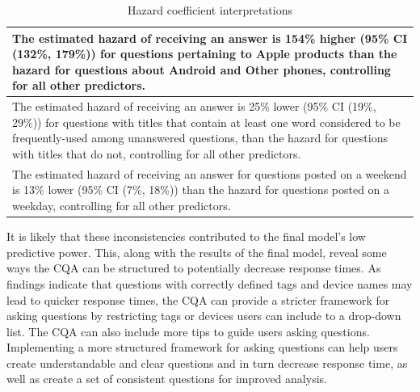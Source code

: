 \documentclass[final]{beamer}
\newlength{\onecolwid}
\begin{document}
\begin{frame}[t]
\begin{columns}[t]
\begin{column}{\onecolwid}
\begin{block}

\renewcommand{\arraystretch}{1.15} %
\begin{table}[!htbp]
\begin{tabular}{|p{26cm}|} 
  \hline
  The estimated hazard of receiving an answer is 154\% higher (95\% CI (132\%, 179\%)) for questions pertaining to Apple products than the hazard for questions about Android and Other phones, controlling for all other predictors. \\ \hline
  The estimated hazard of receiving an answer is 25\% lower (95\% CI (19\%, 29\%)) for questions with titles that contain at least one word considered to be frequently-used among unanswered questions, than the hazard for questions with titles that do not, controlling for all other predictors. \\ \hline
  The estimated hazard of receiving an answer for questions posted on a weekend is 13\% lower (95\% CI (7\%, 18\%)) than the hazard for questions posted on a weekday, controlling for all other predictors. \\ \hline
  \hline
\end{tabular}
\caption{Hazard coefficient interpretations} 
\label{table:hr}
\end{table}

It is likely that these inconsistencies contributed to the final model's low predictive power. This, along with the results of the final model, reveal some ways the CQA can be structured to potentially decrease response times. As findings indicate that questions with correctly defined tags and device names may lead to quicker response times, the CQA can provide a stricter framework for asking questions by restricting tags or devices users can include to a drop-down list. The CQA can also include more tips to guide users asking questions. Implementing a more structured framework for asking questions can help users create understandable and clear questions and in turn decrease response time, as well as create a set of consistent questions for improved analysis. 

\end{block}




\end{column}
\end{columns}
\end{frame}
\end{document}
